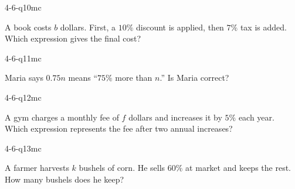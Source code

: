 \begin{practiceQuestion}{4-6-q10}{mc}
\begin{questionText}
A book costs $b$ dollars. First, a $10\%$ discount is applied, then $7\%$ tax is added. Which expression gives the final cost?
\end{questionText}
\end{practiceQuestion}

\begin{practiceQuestion}{4-6-q11}{mc}
\begin{questionText}
Maria says $0.75n$ means ``$75\%$ more than $n$.'' Is Maria correct?
\end{questionText}
\end{practiceQuestion}

\begin{practiceQuestion}{4-6-q12}{mc}
\begin{questionText}
A gym charges a monthly fee of $f$ dollars and increases it by $5\%$ each year. Which expression represents the fee after two annual increases?
\end{questionText}
\end{practiceQuestion}

\begin{practiceQuestion}{4-6-q13}{mc}
\begin{questionText}
A farmer harvests $k$ bushels of corn. He sells $60\%$ at market and keeps the rest. How many bushels does he keep?
\end{questionText}
\end{practiceQuestion}

